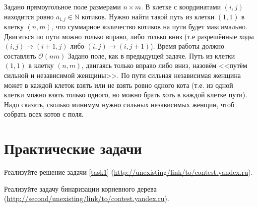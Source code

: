 \documentclass[addpoints]{exam}
\begin{document}
\begin{questions}
\question[1] Задано прямоугольное поле размерами $n \times m$. В клетке с координатами $(i,j)$ находится ровно $a_{i,j} \in \mathbb{N}$ котиков. Нужно найти такой путь из клетки $(1,1)$ в клетку $(n, m)$, что суммарное количество котиков на пути будет максимально. Двигаться по пути можно только вправо, либо только вниз (т.е разрешённые ходы $(i,j) \rightarrow (i+1,j)$ либо $(i,j) \rightarrow (i, j+1)$). Время работы должно составлять $\mathcal{O}(nm)$   
\question Задано поле, как в предыдущей задаче. Путь из клетки $(1,1)$ в клетку $(n,m)$, двигаясь только вправо либо вниз, назовём <<путём сильной и независимой женщины>>. По пути сильная независимая женщина может в каждой клеток взять или не взять ровно одного кота (т.е. из одной клетки можно взять только одного, но можно брать хоть в каждой клетке пути). Надо сказать, сколько минимум нужно сильных независимых женщин, чтоб собрать всех котов с поля.


\section{Практические задачи}

\question[1] Реализуйте решение задачи \ref{task1} (\url{http://unexisting/link/to/contest.yandex.ru}).

\question[1] Реализуйте задачу бинаризации корневного дерева
(\url{http://second/unexisting/link/to/contest.yandex.ru}).

\end{questions}


\begin{center}
\pointtable[h][questions]
\end{center}
\end{document}
